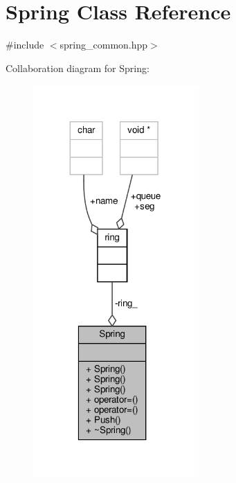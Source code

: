 \hypertarget{classSpring}{}\section{Spring Class Reference}
\label{classSpring}


{\ttfamily \#include $<$spring\+\_\+common.\+hpp$>$}



Collaboration diagram for Spring\+:
\nopagebreak
\begin{figure}[H]
\begin{center}
\leavevmode
\includegraphics[width=179pt]{classSpring__coll__graph}
\end{center}
\end{figure}
